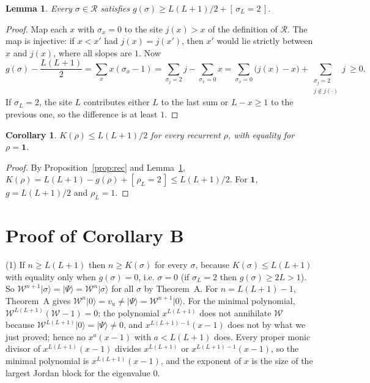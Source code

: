 \documentclass[11pt]{amsart}
\newtheorem{lemma}[theorem]{Lemma}
\newtheorem{corollary}[theorem]{Corollary}
\theoremstyle{definition}
\theoremstyle{remark}
\newcommand{\cR}{\mathcal{R}}
\newcommand{\cW}{\mathcal{W}}
\newcommand{\ket}[1]{|#1\rangle}
\newcommand{\one}{\mathbf{1}}
\newcommand{\Ind}[1]{[\,#1\,]}
\begin{document}
\begin{lemma}\label{lem:recgrains}
Every $\sigma\in\cR$ satisfies $g(\sigma)\ge L(L+1)/2+\Ind{\sigma_L=2}$.
\end{lemma}

\begin{proof}
Map each $x$ with $\sigma_x=0$ to the site $j(x)>x$ of the definition of $\cR$. The map is injective: if $x<x'$ had $j(x)=j(x')$, then $x'$ would lie strictly between $x$ and $j(x)$, where all slopes are $1$. Now
\[
g(\sigma)-\frac{L(L+1)}{2}=\sum_x x(\sigma_x-1)=\sum_{\sigma_j=2}j-\sum_{\sigma_x=0}x=\sum_{\sigma_x=0}\bigl(j(x)-x\bigr)+\sum_{\substack{\sigma_j=2\\ j\notin j(\cdot)}}j\ \ge0 .
\]
If $\sigma_L=2$, the site $L$ contributes either $L$ to the last sum or $L-x\ge1$ to the previous one, so the difference is at least $1$.
\end{proof}

\begin{corollary}\label{cor:recK}
$K(\rho)\le L(L+1)/2$ for every recurrent $\rho$, with equality for $\rho=\one$.
\end{corollary}

\begin{proof}
By Proposition~\ref{prop:rec} and Lemma~\ref{lem:recgrains}, $K(\rho)=L(L+1)-g(\rho)+\Ind{\rho_L=2}\le L(L+1)/2$. For $\one$, $g=L(L+1)/2$ and $\rho_L=1$.
\end{proof}

\section{Proof of Corollary B}\label{sec:proofB}

(1) If $n\ge L(L+1)$ then $n\ge K(\sigma)$ for every $\sigma$, because $K(\sigma)\le L(L+1)$ with equality only when $g(\sigma)=0$, i.e. $\sigma=0$ (if $\sigma_L=2$ then $g(\sigma)\ge2L>1$). So $\cW^{n+1}\ket\sigma=\ket\Psi=\cW^n\ket\sigma$ for all $\sigma$ by Theorem~A. For $n=L(L+1)-1$, Theorem~A gives $\cW^n\ket0=v_u\ne\ket\Psi=\cW^{n+1}\ket0$. For the minimal polynomial, $\cW^{L(L+1)}(\cW-1)=0$; the polynomial $x^{L(L+1)}$ does not annihilate $\cW$ because $\cW^{L(L+1)}\ket0=\ket\Psi\ne0$, and $x^{L(L+1)-1}(x-1)$ does not by what we just proved; hence no $x^a(x-1)$ with $a<L(L+1)$ does. Every proper monic divisor of $x^{L(L+1)}(x-1)$ divides $x^{L(L+1)}$ or $x^{L(L+1)-1}(x-1)$, so the minimal polynomial is $x^{L(L+1)}(x-1)$, and the exponent of $x$ is the size of the largest Jordan block for the eigenvalue $0$.
\end{document}
